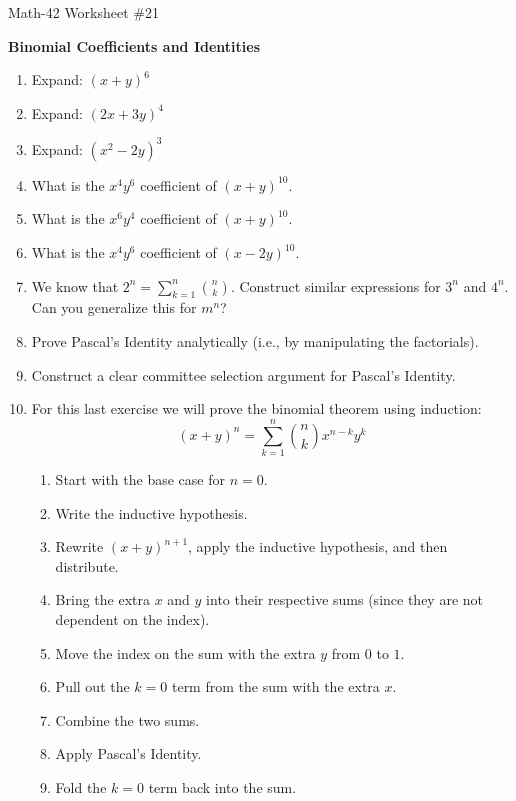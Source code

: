 \documentclass[letterpaper,12pt,fleqn]{article}
\begin{document}
\begin{center}
  \large Math-42 Worksheet \#21

  \textbf{Binomial Coefficients and Identities}
\end{center}

\vspace{0.5in}

\begin{enumerate}[left=0in,itemsep=0.5in]
\item Expand: \((x+y)^6\)

\item Expand: \((2x+3y)^4\)

\item Expand: \((x^2-2y)^3\)

\item What is the \(x^4y^6\) coefficient of \((x+y)^{10}\).

\item What is the \(x^6y^4\) coefficient of \((x+y)^{10}\).

\item What is the \(x^4y^6\) coefficient of \((x-2y)^{10}\).

\item We know that \(\displaystyle2^n=\sum_{k=1}^n\binom{n}{k}\).  Construct similar expressions for \(3^n\) and
  \(4^n\).  Can you generalize this for \(m^n\)?

\item Prove Pascal's Identity analytically (i.e., by manipulating the factorials).

\item Construct a clear committee selection argument for Pascal's Identity.

\item For this last exercise we will prove the binomial theorem using induction:
  \[(x+y)^n=\sum_{k=1}^n\binom{n}{k}x^{n-k}y^k\]
  \begin{enumerate}
  \item Start with the base case for \(n=0\).
  \item Write the inductive hypothesis.
  \item Rewrite \((x+y)^{n+1}\), apply the inductive hypothesis, and then distribute.
  \item Bring the extra \(x\) and \(y\) into their respective sums (since they are not dependent on the index).
  \item Move the index on the sum with the extra \(y\) from \(0\) to \(1\).
  \item Pull out the \(k=0\) term from the sum with the extra \(x\).
  \item Combine the two sums.
  \item Apply Pascal's Identity.
  \item Fold the \(k=0\) term back into the sum.
  \end{enumerate}
\end{enumerate}
\end{document}
